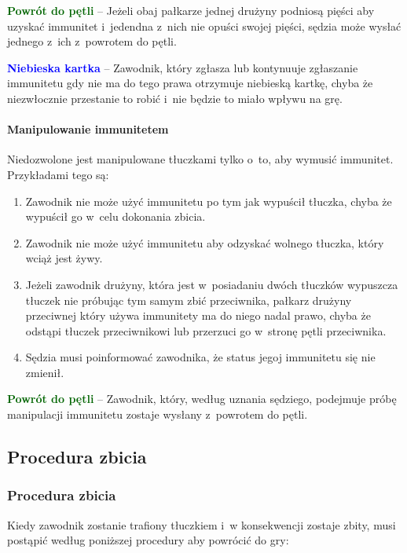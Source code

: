 \documentclass[12pt,a4paper]{article}
\newcommand\bluecard[1]{\bgroup\textcolor{blue}{\textbf{#1}}}
\newcommand\other[1]{\bgroup\textcolor{darkgreen}{\textbf{#1}}}
\begin{document}
\other{Powrót do pętli} -- Jeżeli obaj pałkarze jednej drużyny podniosą
pięści aby uzyskać immunitet i~jedendna z~nich nie opuści swojej pięści,
sędzia może wysłać jednego z~ich z~powrotem do pętli.

\bluecard{Niebieska kartka} -- Zawodnik, który zgłasza lub kontynuuje
zgłaszanie immunitetu gdy nie ma do tego prawa otrzymuje niebieską
kartkę, chyba że niezwłocznie przestanie to robić i~nie będzie to miało
wpływu na grę.

\paragraph{Manipulowanie immunitetem}
Niedozwolone jest manipulowane
tłuczkami tylko o~to, aby wymusić immunitet. Przykładami tego są:

\begin{enumerate}
	\item
	      Zawodnik nie może użyć immunitetu po tym jak wypuścił tłuczka, chyba
	      że wypuścił go w~celu dokonania zbicia.
	\item
	      Zawodnik nie może użyć immunitetu aby odzyskać wolnego tłuczka, który
	      wciąż jest żywy.
	\item
	      Jeżeli zawodnik drużyny, która jest w~posiadaniu dwóch tłuczków
	      wypuszcza tłuczek nie próbując tym samym zbić przeciwnika, pałkarz
	      drużyny przeciwnej który używa immunitety ma do niego nadal prawo,
	      chyba że odstąpi tłuczek przeciwnikowi lub przerzuci go w~stronę
	      pętli przeciwnika.
	\item
	      Sędzia musi poinformować zawodnika, że status jegoj immunitetu się nie
	      zmienił.
\end{enumerate}

\other{Powrót do pętli} -- Zawodnik, który, według uznania sędziego,
podejmuje próbę manipulacji immunitetu zostaje wysłany z~powrotem do
pętli.

\subsection{Procedura zbicia}

\subsubsection{Procedura zbicia}

Kiedy zawodnik zostanie trafiony tłuczkiem i~w konsekwencji zostaje
zbity, musi postąpić według poniższej procedury aby powrócić do gry:
\end{document}
